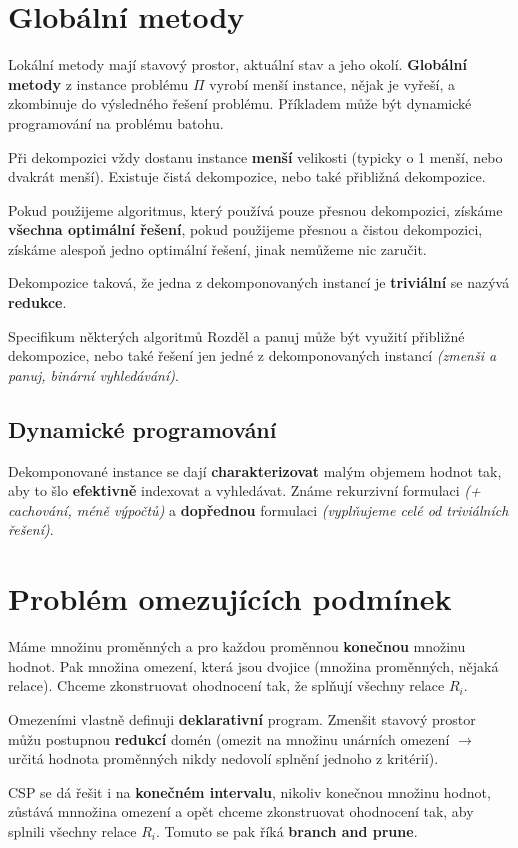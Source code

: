 \section{Globální metody}

Lokální metody mají stavový prostor, aktuální stav a jeho okolí. \textbf{Globální metody} z instance problému $\Pi$ vyrobí menší instance, nějak je vyřeší, a zkombinuje do výsledného řešení problému. Příkladem může být dynamické programování na problému batohu.

Při dekompozici vždy dostanu instance \textbf{menší} velikosti (typicky o 1 menší, nebo dvakrát menší). Existuje čistá dekompozice, nebo také přibližná dekompozice.

Pokud použijeme algoritmus, který používá pouze přesnou dekompozici, získáme \textbf{všechna optimální řešení}, pokud použijeme přesnou a čistou dekompozici, získáme alespoň jedno optimální řešení, jinak nemůžeme nic zaručit.

Dekompozice taková, že jedna z dekomponovaných instancí je \textbf{triviální} se nazývá \textbf{redukce}.

Specifikum některých algoritmů Rozděl a panuj může být využití přibližné dekompozice, nebo také řešení jen jedné z dekomponovaných instancí \textit{(zmenši a panuj, binární vyhledávání)}.

\subsection{Dynamické programování}

Dekomponované instance se dají \textbf{charakterizovat} malým objemem hodnot tak, aby to šlo \textbf{efektivně} indexovat a vyhledávat. Známe rekurzivní formulaci \textit{(+ cachování, méně výpočtů)} a \textbf{dopřednou} formulaci \textit{(vyplňujeme celé od triviálních řešení)}.

\section{Problém omezujících podmínek}

Máme množinu proměnných a pro každou proměnnou \textbf{konečnou} množinu hodnot. Pak množina omezení, která jsou dvojice (množina proměnných, nějaká relace). Chceme zkonstruovat ohodnocení tak, že splňují všechny relace $R_i$.

\vspace{4pt}
\noindent Omezeními vlastně definuji \textbf{deklarativní} program. Zmenšit stavový prostor můžu postupnou \textbf{redukcí} domén (omezit na množinu unárních omezení $\to$ určitá hodnota proměnných nikdy nedovolí splnění jednoho z kritérií).

\vspace{4pt}
\noindent CSP se dá řešit i na \textbf{konečném intervalu}, nikoliv konečnou množinu hodnot, zůstává mnnožina omezení a opět chceme zkonstruovat ohodnocení tak, aby splnili všechny relace $R_i$. Tomuto se pak říká \textbf{branch and prune}.